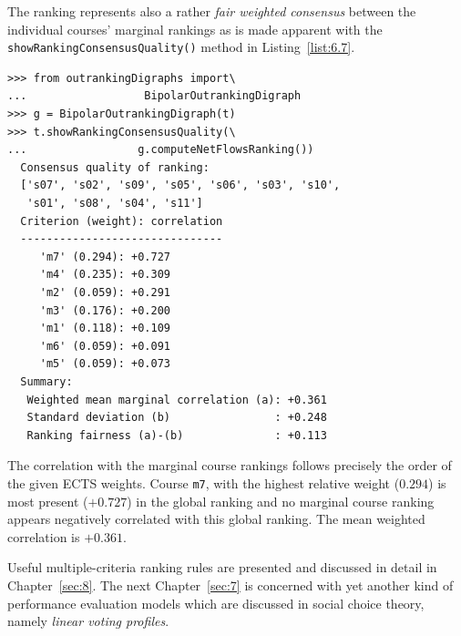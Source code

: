 The \NetFlows ranking represents also a rather \emph{fair weighted consensus} between the individual courses' marginal rankings as is made apparent with the \texttt{showRankingConsensusQuality()} method in Listing~\vref{list:6.7}.
\begin{lstlisting}[caption={Consensus quality of the students's ranking},label=list:6.7]
>>> from outrankingDigraphs import\
...                  BipolarOutrankingDigraph
>>> g = BipolarOutrankingDigraph(t)
>>> t.showRankingConsensusQuality(\
...                 g.computeNetFlowsRanking())
  Consensus quality of ranking:
  ['s07', 's02', 's09', 's05', 's06', 's03', 's10',
   's01', 's08', 's04', 's11']
  Criterion (weight): correlation
  -------------------------------
     'm7' (0.294): +0.727
     'm4' (0.235): +0.309
     'm2' (0.059): +0.291
     'm3' (0.176): +0.200
     'm1' (0.118): +0.109
     'm6' (0.059): +0.091
     'm5' (0.059): +0.073
  Summary:
   Weighted mean marginal correlation (a): +0.361
   Standard deviation (b)                : +0.248
   Ranking fairness (a)-(b)              : +0.113
\end{lstlisting}

The correlation with the marginal course rankings follows precisely the order of the given ECTS weights. Course \texttt{m7}, with the highest relative weight ($0.294$) is most present ($+0.727$) in the global \NetFlows ranking and no marginal course ranking appears negatively correlated with this global ranking. The mean weighted correlation is $+0.361$.

\vspace{\baselineskip}
Useful multiple-criteria ranking rules are presented and discussed in detail in Chapter~\ref{sec:8}. The next Chapter~\ref{sec:7} is concerned with yet another kind of performance evaluation models which are discussed in social choice theory, namely \emph{linear voting profiles}.

% 


